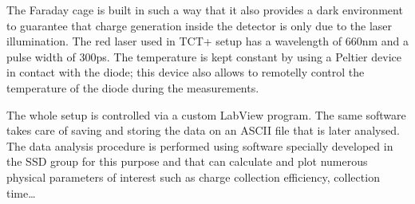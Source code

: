 The Faraday cage is built in such a way that it also provides a dark environment to guarantee that charge generation inside the detector is only due to the laser illumination. The red laser used in TCT+ setup has a wavelength of 660nm and a pulse width of 300ps. The temperature is kept constant by using a Peltier device in contact with the diode; this device also allows to remotelly control the temperature of the diode during the measurements.

The whole setup is controlled via a custom LabView\cite{labview} program. The same software takes care of saving and storing the data on an ASCII file that is later analysed. The data analysis procedure is performed using software specially developed in the SSD group for this purpose and that can calculate and plot numerous physical parameters of interest such as charge collection efficiency, collection time\ldots


